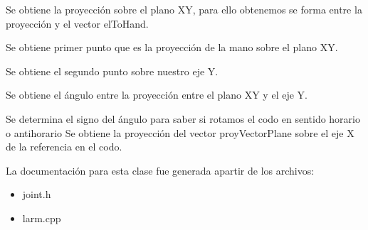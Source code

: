 \-Se obtiene la proyección sobre el plano \-X\-Y, para ello obtenemos se forma entre la proyección y el vector el\-To\-Hand.

\-Se obtiene primer punto que es la proyección de la mano sobre el plano \-X\-Y.

\-Se obtiene el segundo punto sobre nuestro eje \-Y.

\-Se obtiene el ángulo entre la proyección entre el plano \-X\-Y y el eje \-Y.

\-Se determina el signo del ángulo para saber si rotamos el codo en sentido horario o antihorario \-Se obtiene la proyección del vector proy\-Vector\-Plane sobre el eje \-X de la referencia en el codo. 

\-La documentación para esta clase fue generada apartir de los archivos\-:\begin{itemize}
\item 
joint.\-h\item 
larm.\-cpp\end{itemize}
